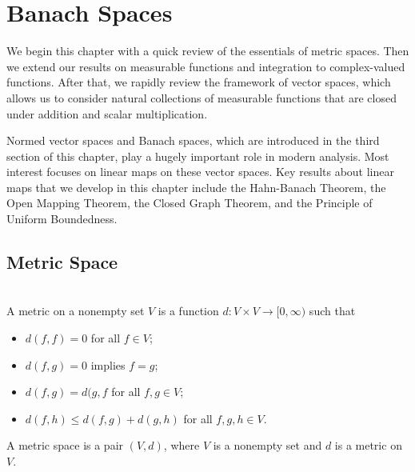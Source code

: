 \documentclass[12pt]{book}
\begin{document}
\chapter{Banach Spaces}
We begin this chapter with a quick review of the essentials of metric spaces. Then we extend our results on measurable functions and integration to complex-valued functions. After that, we rapidly review the framework of vector spaces, which allows us to consider natural collections of measurable functions that are closed under addition and scalar multiplication.

Normed vector spaces and Banach spaces, which are introduced in the third section of this chapter, play a hugely important role in modern analysis. Most interest focuses on linear maps on these vector spaces. Key results about linear maps that we develop in this chapter include the Hahn-Banach Theorem, the Open Mapping Theorem, the Closed Graph Theorem, and the Principle of Uniform Boundedness.
\newpage
\section{Metric Space}
\begin{definition} \ \\
A metric on a nonempty set $V$ is a function $d:V\times V \to [0,\infty)$ such that
\begin{itemize}
	\item $d(f,f)=0$ for all $f\in V$;
	\item $d(f,g)=0$ implies $f=g$;
	\item $d(f,g)=d(g,f$ for all $f,g \in V$;
	\item $d(f,h)\leq d(f,g)+d(g,h)$ for all $f,g,h \in V$. 
\end{itemize}
A metric space is a pair $(V,d)$, where $V$ is a nonempty set and $d$ is a metric on $V$.
\end{definition}
\end{document}
